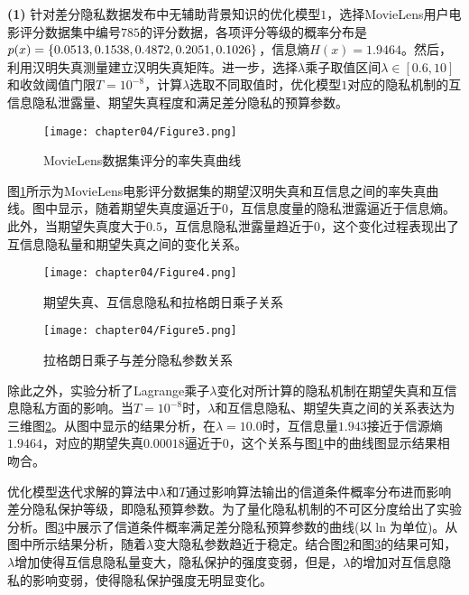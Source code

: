 \textbf{(1)} 针对差分隐私数据发布中无辅助背景知识的优化模型$1$，选择MovieLens用户电影评分数据集中编号$785$的评分数据，各项评分等级的概率分布是$p(x)=\{0.0513,0.1538,\\0.4872,0.2051,0.1026\}$，信息熵$H(x)=1.9464$。然后，利用汉明失真测量建立汉明失真矩阵。进一步，选择$\lambda$乘子取值区间$\lambda \in [0.6,10]$和收敛阈值门限$T=10^{-8}$，计算$\lambda$选取不同取值时，优化模型$1$对应的隐私机制的互信息隐私泄露量、期望失真程度和满足差分隐私的预算参数。
\begin{figure}[htbp]
\centering
\texttt{[image: chapter04/Figure3.png]}
\caption{MovieLens数据集评分的率失真曲线}
\label{Fig:chapter05-3}
\end{figure}

图\ref{Fig:chapter05-3}所示为MovieLens电影评分数据集的期望汉明失真和互信息之间的率失真曲线。图中显示，随着期望失真度逼近于$0$，互信息度量的隐私泄露逼近于信息熵。此外，当期望失真度大于$0.5$，互信息隐私泄露量趋近于$0$，这个变化过程表现出了互信息隐私量和期望失真之间的变化关系。
\begin{figure}[htbp]
\centering
\texttt{[image: chapter04/Figure4.png]}
\caption{ 期望失真、互信息隐私和拉格朗日乘子关系}
\label{Fig:chapter05-4}
\end{figure}
\begin{figure}[htbp]
\centering
\texttt{[image: chapter04/Figure5.png]}
\caption{拉格朗日乘子与差分隐私参数关系}
\label{Fig:chapter05-5}
\end{figure}

除此之外，实验分析了Lagrange乘子$\lambda$变化对所计算的隐私机制在期望失真和互信息隐私方面的影响。当$T=10^{-8}$时，$\lambda$和互信息隐私、期望失真之间的关系表达为三维图\ref{Fig:chapter05-4}。从图中显示的结果分析，在$\lambda=10.0$时，互信息量$1.943$接近于信源熵$1.9464$，对应的期望失真$0.00018$逼近于$0$，这个关系与图\ref{Fig:chapter05-3}中的曲线图显示结果相吻合。

优化模型迭代求解的算法中$\lambda$和$T$通过影响算法输出的信道条件概率分布进而影响差分隐私保护等级，即隐私预算参数。为了量化隐私机制的不可区分度给出了实验分析。图\ref{Fig:chapter05-5}中展示了信道条件概率满足差分隐私预算参数的曲线(以$\ln$为单位)。从图中所示结果分析，随着$\lambda$变大隐私参数趋近于稳定。结合图\ref{Fig:chapter05-4}和图\ref{Fig:chapter05-5}的结果可知，$\lambda$增加使得互信息隐私量变大，隐私保护的强度变弱，但是，$\lambda$的增加对互信息隐私的影响变弱，使得隐私保护强度无明显变化。



